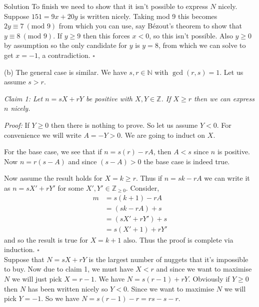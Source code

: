 \documentclass{article}
\begin{document}
\begin{solution}{Solution}
To finish we need to show that it isn't possible to express $N$ nicely.
Suppose $151 = 9x + 20y$ is written nicely. Taking mod 9 this becomes
$2y \equiv 7 \ (\text{mod } 9)$ from which you can use, say Bézout's
theorem to show that $y \equiv 8 \ (\text{mod } 9)$. If $y \geq 9$ then
this forces $x < 0$, so this isn't possible. Also $y \geq 0$ by assumption
so the only candidate for $y$ is $y = 8$, from which we can solve to get
$x = -1$, a contradiction. $\square$ \\ \bigskip

(b) The general case is similar. We have $s,r \in \mathbb{N}$ with
$\gcd(r,s) = 1$. Let us assume $s > r$. \vspace{0.2cm}

\textit{Claim 1: Let $n = sX + rY$ be positive with $X,Y \in \mathbb{Z}$.
If $X \geq r$ then we can express $n$ nicely.} \vspace{0.2cm}

\textit{Proof: } If $Y \geq 0$ then there is nothing to prove. So let us
assume $Y < 0$. For convenience we will write $A = -Y > 0$.
We are going to induct on $X$. \vspace{0.2cm}

For the base case, we see that if $n = s(r) - rA$, then $A < s$ since
$n$ is positive. Now $n = r(s - A)$ and since $(s - A) > 0$ the base
case is indeed true. \vspace{0.2cm}

Now assume the result holds for $X = k \geq r$. Thus if $n = sk - rA$ we
can write it as $n = sX' + rY'$ for some $X', Y' \in \mathbb{Z}_{\geq 0}$.
Consider,
\[
\begin{aligned}
m &= s(k + 1) - rA \\
&= (sk - rA) + s \\
&= (sX' + rY') + s \\
&= s(X' + 1) + rY'
\end{aligned}
\]
and so the result is true for $X = k+1$ also. Thus the proof is complete
via induction. $\square$ \\

Suppose that $N = sX + rY$ is the largest number of nuggets that it's
impossible to buy. Now due to claim 1, we must have $X < r$ and since we
want to maximise $N$ we will just pick $X = r-1$. We have
$N = s(r-1) + rY$. Obviously if $Y \geq 0$ then $N$ has been written nicely
so $Y < 0$. Since we want to maximise $N$ we will pick $Y = -1$.
So we have $N = s(r-1) - r = rs - s -r$. \vspace{0.2cm}


\end{solution}
\end{document}
